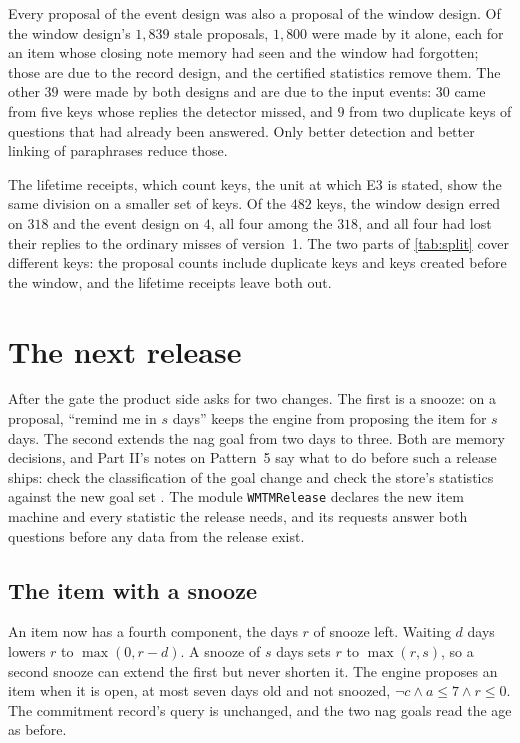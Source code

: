 \documentclass[11pt]{article}
\newcommand{\code}[1]{\texttt{#1}}
\theoremstyle{definition}
\theoremstyle{plain}
\begin{document}
Every proposal of the event design was also a proposal of the window design. Of the window design's
$1{,}839$ stale proposals, $1{,}800$ were made by it alone, each for an item whose closing note
memory had seen and the window had forgotten; those are due to the record design, and the certified
statistics remove them. The other $39$ were made by both designs and are due to the input events:
$30$ came from five keys whose replies the detector missed, and $9$ from two duplicate keys of
questions that had already been answered. Only better detection and better linking of paraphrases
reduce those.

The lifetime receipts, which count keys, the unit at which E3 is stated, show the same division on
a smaller set of keys. Of the $482$ keys, the window design erred on $318$ and the event design on
$4$, all four among the $318$, and all four had lost their replies to the ordinary misses of
version~1. The two parts of \cref{tab:split} cover different keys: the proposal counts include
duplicate keys and keys created before the window, and the lifetime receipts leave both out.
\section{The next release}\label{sec:release}

After the gate the product side asks for two changes. The first is a snooze: on a proposal, ``remind
me in $s$ days'' keeps the engine from proposing the item for $s$ days. The second extends the nag
goal from two days to three. Both are memory decisions, and Part II's notes on Pattern~5 say what
to do before such a release ships: check the classification of the goal change and check the
store's statistics against the new goal set \cite[Section~6.5]{part2}. The module
\code{WMTMRelease} declares the new item machine and every statistic the release needs, and its
requests answer both questions before any data from the release exist.

\subsection{The item with a snooze}\label{sec:snooze}

An item now has a fourth component, the days $r$ of snooze left. Waiting $d$ days lowers $r$ to
$\max(0,r-d)$. A snooze of $s$ days sets $r$ to $\max(r,s)$, so a second snooze can extend the
first but never shorten it. The engine proposes an item when it is open, at most seven days old and
not snoozed, $\neg c\wedge a\le 7\wedge r\le 0$. The commitment record's query is unchanged, and the
two nag goals read the age as before.
\end{document}
